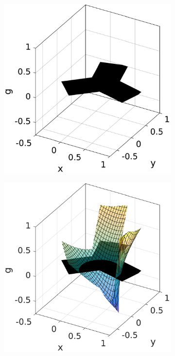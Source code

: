 \documentclass[conference]{IEEEtran}
\begin{document}
\begin{figure}[t]
  \centering
  \begin{subfigure}[b]{0.24\textwidth}
    \centering
    \includegraphics[width=1\linewidth]{./fig/moment_hull_1}
    \caption{}
  \end{subfigure}
  \begin{subfigure}[b]{0.24\textwidth}
    \centering
    \includegraphics[width=1\linewidth]{fig/moment_hull_2}

\end{subfigure}
\end{figure}
\end{document}
